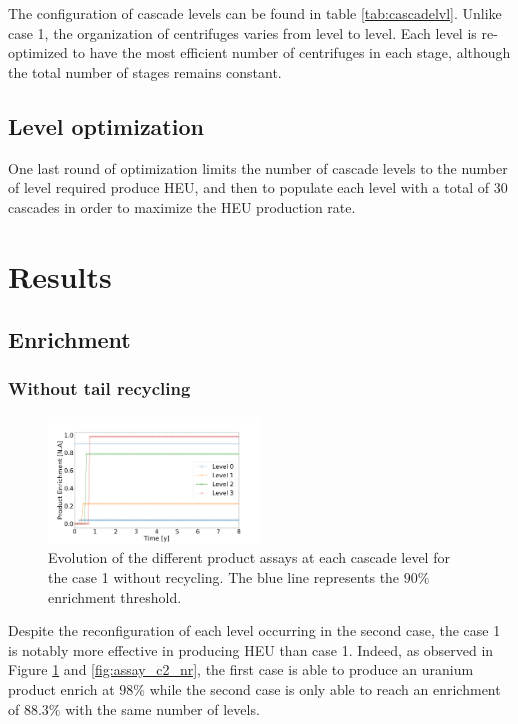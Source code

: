 \documentclass{anstrans}
\begin{document}
The configuration of cascade levels can be found in table
\ref{tab:cascadelvl}. Unlike case 1, the organization of centrifuges varies from
level to level. Each level is re-optimized to have the most efficient number of
centrifuges in each stage, although the total number of stages remains constant.


\subsection{Level optimization}

One last round of optimization limits the number of cascade
levels to the number of level required produce HEU, and then to populate each level with a total of 30 cascades in order to maximize the HEU production rate.

\section{Results}
\subsection{Enrichment}
\subsubsection{Without tail recycling}

\begin{figure}[ht] %
  \centering
  \includegraphics[width=0.5\textwidth]{assay_case_1_no_rec.png}
  \caption{Evolution of the different product assays at each cascade level for
  the case 1 without recycling. The blue line represents the $90\%$ enrichment
  threshold.}\label{fig:assay_c1_nr}
\end{figure}
Despite the reconfiguration of each level occurring in the second case, the case
1 is notably more effective in producing HEU than case 1. Indeed, as observed in
Figure \ref{fig:assay_c1_nr} and \ref{fig:assay_c2_nr}, the first case is able
to produce an uranium product enrich at $98\%$ while the second case is only
able to reach an enrichment of $88.3\%$ with the same number of levels.
\end{document}
